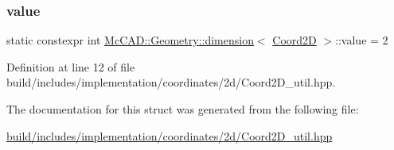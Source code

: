 \subsubsection{\texorpdfstring{value}{value}}
{\footnotesize\ttfamily static constexpr int \hyperlink{structMcCAD_1_1Geometry_1_1dimension}{Mc\+C\+A\+D\+::\+Geometry\+::dimension}$<$ \hyperlink{classMcCAD_1_1Geometry_1_1Coord2D}{Coord2D} $>$\+::value = 2\hspace{0.3cm}{\ttfamily [static]}}



Definition at line 12 of file build/includes/implementation/coordinates/2d/\+Coord2\+D\+\_\+util.\+hpp.



The documentation for this struct was generated from the following file\+:\begin{DoxyCompactItemize}
\item 
\hyperlink{build_2includes_2implementation_2coordinates_22d_2Coord2D__util_8hpp}{build/includes/implementation/coordinates/2d/\+Coord2\+D\+\_\+util.\+hpp}\end{DoxyCompactItemize}
